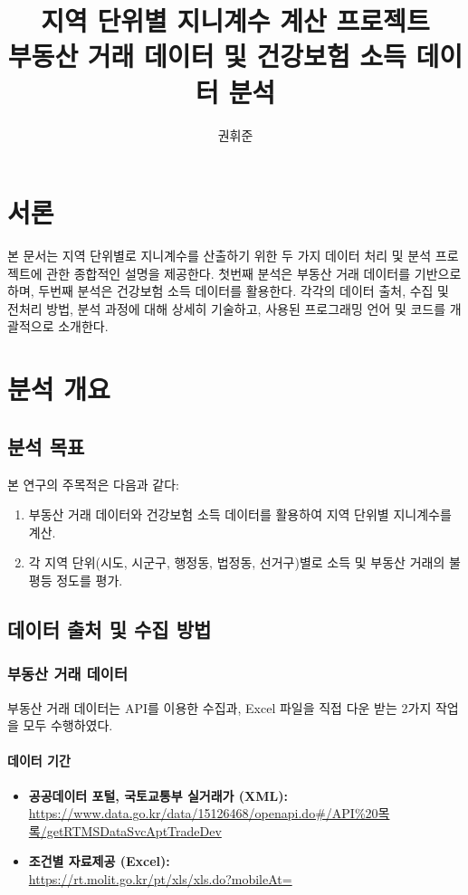 \documentclass[a4paper,10pt]{article}
\title{지역 단위별 지니계수 계산 프로젝트 \\ \vspace{0.3cm} \large 부동산 거래 데이터 및 건강보험 소득 데이터 분석}
\author{권휘준}
\date{}
\begin{document}
\maketitle
\tableofcontents
\newpage

\section{서론}
본 문서는 지역 단위별로 지니계수를 산출하기 위한 두 가지 데이터 처리 및 분석 프로젝트에 관한 종합적인 설명을 제공한다. 첫번째 분석은 부동산 거래 데이터를 기반으로 하며, 두번째 분석은 건강보험 소득 데이터를 활용한다. 각각의 데이터 출처, 수집 및 전처리 방법, 분석 과정에 대해 상세히 기술하고, 사용된 프로그래밍 언어 및 코드를 개괄적으로 소개한다.

\section{분석 개요}
\subsection{분석 목표}
본 연구의 주목적은 다음과 같다:
\begin{enumerate}[1)]
    \item 부동산 거래 데이터와 건강보험 소득 데이터를 활용하여 지역 단위별 지니계수를 계산.
    \item 각 지역 단위(시도, 시군구, 행정동, 법정동, 선거구)별로 소득 및 부동산 거래의 불평등 정도를 평가.
\end{enumerate}

\subsection{데이터 출처 및 수집 방법}
\subsubsection{부동산 거래 데이터}
부동산 거래 데이터는 API를 이용한 수집과, Excel 파일을 직접 다운 받는 2가지 작업을 모두 수행하였다. 
\paragraph{데이터 기간}
\begin{itemize}
    \item \textbf{공공데이터 포털, 국토교통부 실거래가 (XML):} \\
    \url{https://www.data.go.kr/data/15126468/openapi.do#/API%20목록/getRTMSDataSvcAptTradeDev}
    \item \textbf{조건별 자료제공 (Excel):} \\
    \url{https://rt.molit.go.kr/pt/xls/xls.do?mobileAt=}
\end{itemize}
\end{document}
